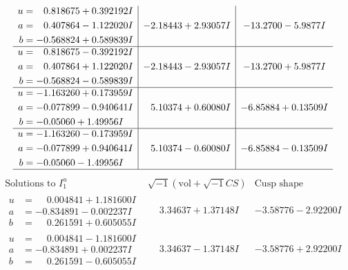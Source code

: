 \documentclass[1p]{elsarticle_modified}
\theoremstyle{definition}
\newcommand{\I}{\sqrt{-1}}
\begin{document}
$$\begin{array}{c|c|c}
\begin{aligned}
u &= \phantom{-}0.818675 + 0.392192 I \\
a &= \phantom{-}0.407864 - 1.122020 I \\
b &= -0.568824 + 0.589839 I\end{aligned}
 & -2.18443 + 2.93057 I & -13.2700 - 5.9877 I \\ \hline\begin{aligned}
u &= \phantom{-}0.818675 - 0.392192 I \\
a &= \phantom{-}0.407864 + 1.122020 I \\
b &= -0.568824 - 0.589839 I\end{aligned}
 & -2.18443 - 2.93057 I & -13.2700 + 5.9877 I \\ \hline\begin{aligned}
u &= -1.163260 + 0.173959 I \\
a &= -0.077899 - 0.940641 I \\
b &= -0.05060 + 1.49956 I\end{aligned}
 & \phantom{-}5.10374 + 0.60080 I & -6.85884 + 0.13509 I \\ \hline\begin{aligned}
u &= -1.163260 - 0.173959 I \\
a &= -0.077899 + 0.940641 I \\
b &= -0.05060 - 1.49956 I\end{aligned}
 & \phantom{-}5.10374 - 0.60080 I & -6.85884 - 0.13509 I\\
 \hline 
 \end{array}$$\newpage$$\begin{array}{c|c|c}  
\text{Solutions to }I^u_{1}& \I (\text{vol} + \sqrt{-1}CS) & \text{Cusp shape}\\
 \hline 
\begin{aligned}
u &= \phantom{-}0.004841 + 1.181600 I \\
a &= -0.834891 - 0.002237 I \\
b &= \phantom{-}0.261591 + 0.605055 I\end{aligned}
 & \phantom{-}3.34637 + 1.37148 I & -3.58776 - 2.92200 I \\ \hline\begin{aligned}
u &= \phantom{-}0.004841 - 1.181600 I \\
a &= -0.834891 + 0.002237 I \\
b &= \phantom{-}0.261591 - 0.605055 I\end{aligned}
 & \phantom{-}3.34637 - 1.37148 I & -3.58776 + 2.92200 I \\ \hline\begin{aligned}

\end{aligned}
\end{array}$$
\end{document}
